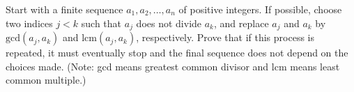 Start with a finite sequence $a_1, a_2, \dots, a_n$ of positive integers.
If possible, choose two indices $j < k$ such that $a_j$ does not divide
$a_k$, and replace $a_j$ and $a_k$ by $\mathrm{gcd}(a_j, a_k)$
and $\mathrm{lcm}(a_j, a_k)$, respectively. Prove that if this process is
repeated, it must eventually stop and the final sequence does not depend
on the choices made. (Note: gcd means greatest common divisor and lcm
means least common multiple.)
